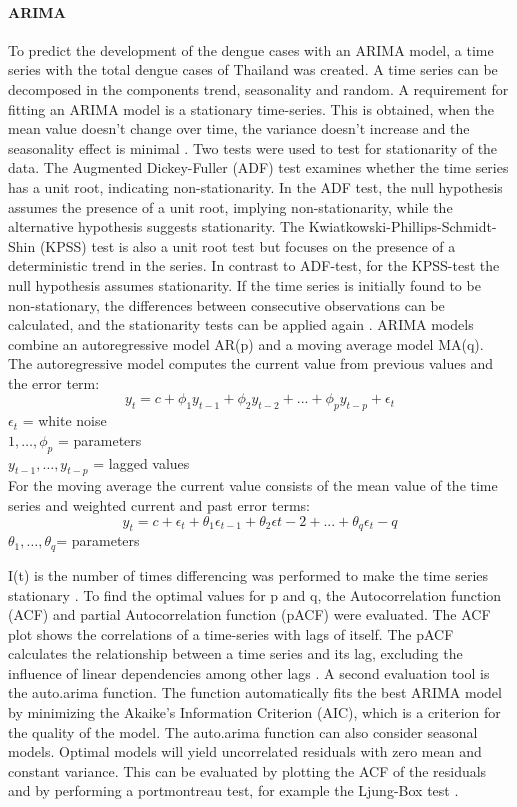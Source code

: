 	\paragraph{ARIMA}
To predict the development of the dengue cases with an ARIMA model, a time series with the total dengue cases of Thailand was created. A time series can be decomposed in the components trend, seasonality and random. 
A requirement for fitting an ARIMA model is a stationary time-series. This is obtained, when the mean value doesn’t change over time, the variance doesn’t increase and the seasonality effect is minimal \citep{Prabhakaran2017}. Two tests were used to test for stationarity of the data. The Augmented Dickey-Fuller (ADF) test examines whether the time series has a unit root, indicating non-stationarity. In the ADF test, the null hypothesis assumes the presence of a unit root, implying non-stationarity, while the alternative hypothesis suggests stationarity. The Kwiatkowski-Phillips-Schmidt-Shin (KPSS) test is also a unit root test but focuses on the presence of a deterministic trend in the series. In contrast to ADF-test, for the KPSS-test the null hypothesis assumes stationarity. If the time series is initially found to be non-stationary, the differences between consecutive observations can be calculated, and the stationarity tests can be applied again \citep{Hyndman2018}.
ARIMA models combine an autoregressive model AR(p) and a moving average model MA(q). 
The autoregressive model computes the current value from previous values and the error term:
	\[y_t = c + \phi_1 y_{t-1} + \phi_2 y_{t-2}+...+ \phi_p y_{t-p}+ \epsilon _t\]
	$\epsilon _t$ = white noise\\
	$1,…,\phi _p$ = parameters\\
	$y_{t-1},…, y_{t-p}$ = lagged values \\
	
	For the moving average the current value consists of the mean value of the time series and weighted current and past error terms: 
	\[y_t=c+\epsilon _t+\theta_1 \epsilon _{t-1}+\theta_2 \epsilon t-2+...+\theta_q \epsilon _t-q\]
	$\theta_1,…, \theta _q $= parameters
	
I(t) is the number of times differencing was performed to make the time series stationary \citep{Venkat2018}.
To find the optimal values for p and q, the Autocorrelation function (ACF) and partial Autocorrelation function (pACF) were evaluated. The ACF plot shows the correlations of a time-series with lags of itself.  The pACF calculates the relationship between a time series and its lag, excluding the influence of linear dependencies among other lags \citep{Prabhakaran2017}.
A second evaluation tool is the auto.arima function. The function automatically fits the best ARIMA model by minimizing the Akaike’s Information Criterion (AIC), which is a criterion for the quality of the model. The auto.arima function can also consider seasonal models. 
Optimal models will yield uncorrelated residuals with zero mean and constant variance. This can be evaluated by plotting the ACF of the residuals and by performing a portmontreau test, for example the Ljung-Box test \citep{Hyndman2018}.

